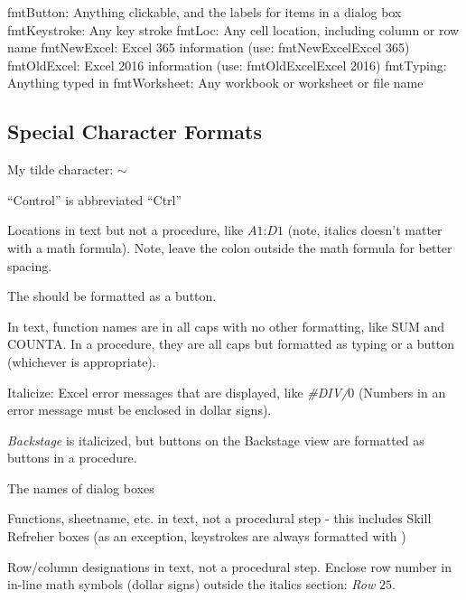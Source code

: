 \begin{enumerate}[resume]
fmtButton: Anything clickable, and the labels for items in a dialog box
fmtKeystroke: Any key stroke
fmtLoc: Any cell location, including column or row name 
fmtNewExcel: Excel 365 information (use: fmtNewExcel{Excel 365})
fmtOldExcel: Excel 2016 information (use: fmtOldExcel{Excel 2016})
fmtTyping: Anything typed in
fmtWorksheet: Any workbook or worksheet or file name



\subsection{Special Character Formats}
My tilde character: $\sim$

``Control'' is abbreviated ``Ctrl''

Locations in text but not a procedure, like $ A1 $:$ D1 $ (note, italics doesn't matter with a math formula). Note, leave the colon outside the math formula for better spacing.

The  should be formatted as a button.

In text, function names are in all caps with no other formatting, like SUM and COUNTA. In a procedure, they are all caps but formatted as typing or a button (whichever is appropriate).

Italicize:
  Excel error messages that are displayed, like \textit{\#DIV/$ 0 $} (Numbers in an error message must be enclosed in dollar signs).
    
  \textit{Backstage} is italicized, but buttons on the Backstage view are formatted as buttons in a procedure.
  
  The names of dialog boxes
  
  Functions, sheetname, etc. in text, not a procedural step - this includes Skill Refreher boxes (as an exception, keystrokes are always formatted with \fmtKeystroke)
  
  Row/column designations in text, not a procedural step. Enclose row number in in-line math symbols (dollar signs) outside the italics section: \textit{Row} $ 25 $.
  

\end{enumerate}
